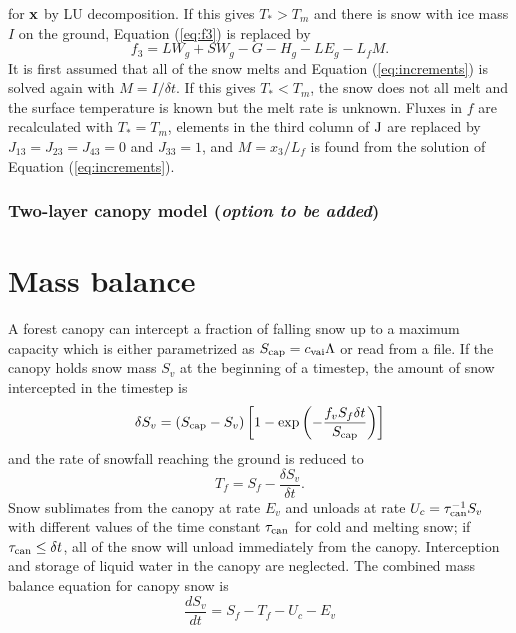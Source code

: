 \documentclass{article}
\begin{document}
for ${\bf x}$ by LU decomposition. If this gives $T_* > T_m$ and there is snow with ice mass $I$ on the ground, Equation (\ref{eq:f3}) is replaced by
\begin{equation}
f_3 = LW_g + SW_g - G - H_g - LE_g - L_fM.
\end{equation}
It is first assumed that all of the snow melts and Equation (\ref{eq:increments}) is solved again with $M = I/\delta t$. If this gives $T_* < T_m$, the snow does not all melt and the surface temperature is known but the melt rate is unknown. Fluxes in $f$ are recalculated with $T_* = T_m$, elements in the third column of ${\rm J}$ are replaced by $J_{13}=J_{23}=J_{43}=0$ and $J_{33}=1$, and $M=x_3/L_f$ is found from the solution of Equation (\ref{eq:increments}).

\subsubsection{Two-layer canopy model ({\it option to be added})}

\section{Mass balance}

A forest canopy can intercept a fraction of falling snow up to a maximum capacity which is either parametrized as $S_{\rm cap} = c_{\rm vai}\Lambda$ or read from a file. If the canopy holds snow mass $S_v$ at the beginning of a timestep, the amount of snow intercepted in the timestep is
\begin{equation}
\delta S_v = (S_{\rm cap} - S_v)\left[1 - \exp\left(-\frac{f_vS_f\delta t}{S_{\rm cap}}
                                \right)\right]
\end{equation}
and the rate of snowfall reaching the ground is reduced to
\begin{equation}
T_f = S_f - \frac{\delta S_v}{\delta t}.
\end{equation}
Snow sublimates from the canopy at rate $E_v$ and unloads at rate $U_c = \tau_{\rm can}^{-1}S_v$ with different values of the time constant $\tau_{\rm can}$ for cold and melting snow; if $\tau_{\rm can} \leq \delta t$, all of the snow will unload immediately from the canopy. Interception and storage of liquid water in the canopy are neglected. The combined mass balance equation for canopy snow is
\begin{equation}
\frac{dS_v}{dt} = S_f - T_f - U_c - E_v
\end{equation}
\end{document}
